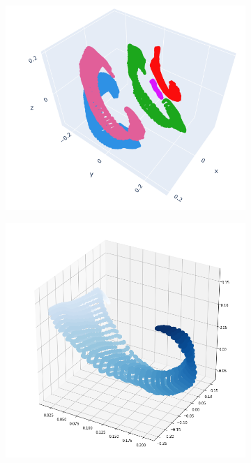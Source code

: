 \begin{figure}[H]
\centering
\begin{subfigure}[b]{0.37\textwidth}
    \includegraphics[width=\textwidth]{figures/embeddings/VGG16-3D-block1.png}
\end{subfigure}
\hfill
\begin{subfigure}[b]{0.3\textwidth}
    \includegraphics[width=\textwidth]{figures/embeddings/vgg16-spatial1.png}

\end{subfigure}
\end{figure}
